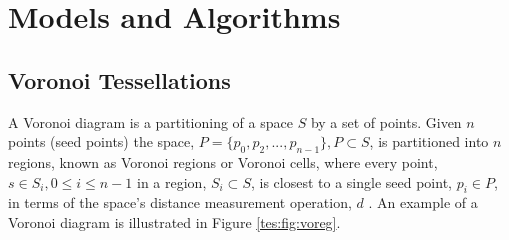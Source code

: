 \section{Models and Algorithms}\label{tes}
\subsection{Voronoi Tessellations}\label{tes:sec:vor}
A Voronoi diagram is a partitioning of a space $S$ by a set of points. Given $n$ points (seed points) the space, $P = \{p_0,p_2,...,p_{n-1}\}, P \subset S$, is partitioned into $n$ regions, known as Voronoi regions or Voronoi cells, where every point, $s \in S_i,0 \leq i \leq n-1$ in a region, $S_i \subset S$, is closest to a single seed point, $p_i \in P$, in terms of the space's distance measurement operation, $d$ \citep{okabe2009spatial}. An example of a Voronoi diagram is illustrated in Figure \ref{tes:fig:voreg}.
%
